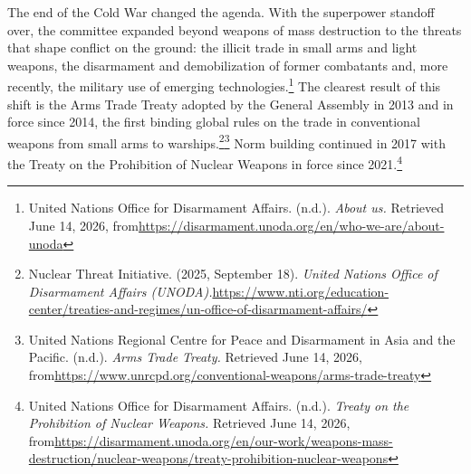 The end of the Cold War changed the agenda. With the superpower standoff over, the committee expanded beyond weapons of mass destruction to the threats that shape conflict on the ground: the illicit trade in small arms and light weapons, the disarmament and demobilization of former combatants and, more recently, the military use of emerging technologies.\footnote{United Nations Office for Disarmament Affairs. (n.d.). \emph{About us.} Retrieved June 14, 2026, from\url{https://disarmament.unoda.org/en/who-we-are/about-unoda}} The clearest result of this shift is the Arms Trade Treaty adopted by the General Assembly in 2013 and in force since 2014, the first binding global rules on the trade in conventional weapons from small arms to warships.\footnote{Nuclear Threat Initiative. (2025, September 18). \emph{United Nations Office of Disarmament Affairs (UNODA).}\url{https://www.nti.org/education-center/treaties-and-regimes/un-office-of-disarmament-affairs/}}\footnote{United Nations Regional Centre for Peace and Disarmament in Asia and the Pacific. (n.d.). \emph{Arms Trade Treaty.} Retrieved June 14, 2026, from\url{https://www.unrcpd.org/conventional-weapons/arms-trade-treaty}} Norm building continued in 2017 with the Treaty on the Prohibition of Nuclear Weapons in force since 2021.\footnote{United Nations Office for Disarmament Affairs. (n.d.). \emph{Treaty on the Prohibition of Nuclear Weapons.} Retrieved June 14, 2026, from\url{https://disarmament.unoda.org/en/our-work/weapons-mass-destruction/nuclear-weapons/treaty-prohibition-nuclear-weapons}}
